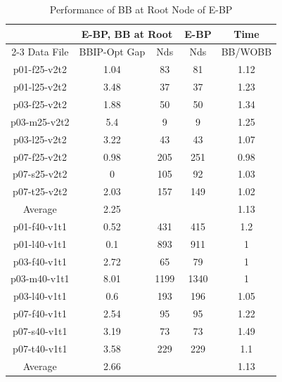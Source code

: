 \begin{table}[!h]
\centering
\caption{Performance of BB at Root Node of E-BP}\label{primal-heur-table3}
\begin {tabular}[!h]{|c|c|c|c|c|}
\hline
\mbox{}   & \multicolumn{2}{|c|}{E-BP, BB at Root} & E-BP & Time \\\cline{2-3}
Data File & BBIP-Opt Gap & Nds & Nds & BB/WOBB \\\hline
p01-f25-v2t2 &  1.04    & 83    & 81    & 1.12  \\
p01-l25-v2t2 &  3.48    & 37    & 37    & 1.23  \\
p03-f25-v2t2 &  1.88    & 50    & 50    & 1.34  \\
p03-m25-v2t2 &  5.4 & 9 & 9 & 1.25  \\
p03-l25-v2t2 &  3.22    & 43    & 43    & 1.07  \\
p07-f25-v2t2 &  0.98    & 205   & 251   & 0.98  \\
p07-s25-v2t2 &  0   & 105   & 92    & 1.03  \\
p07-t25-v2t2 &  2.03    & 157   & 149   & 1.02  \\\hline
Average      &  2.25    & \mbox{} & \mbox{} & 1.13 \\\hline
p01-f40-v1t1 &  0.52    & 431   & 415   & 1.2   \\
p01-l40-v1t1 &  0.1 & 893   & 911   & 1 \\
p03-f40-v1t1 &  2.72    & 65    & 79    & 1 \\
p03-m40-v1t1 &  8.01    & 1199  & 1340  & 1 \\
p03-l40-v1t1 &  0.6 & 193   & 196   & 1.05  \\
p07-f40-v1t1 &  2.54    & 95    & 95    & 1.22  \\
p07-s40-v1t1 &  3.19    & 73    & 73    & 1.49  \\
p07-t40-v1t1 &  3.58    & 229   & 229   & 1.1   \\\hline
Average      &  2.66    & \mbox{}& \mbox{} & 1.13 \\\hline
\end{tabular}
\end{table}

